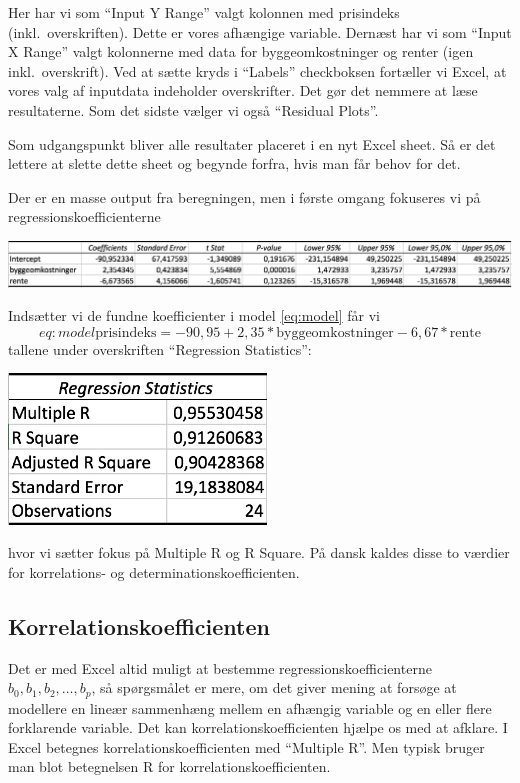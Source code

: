 Her har vi som ``Input Y Range'' valgt kolonnen med prisindeks (inkl.\ overskriften). Dette er vores afhængige variable. Dernæst har vi som ``Input X Range'' valgt kolonnerne med data for byggeomkostninger og renter (igen inkl.\ overskrift). Ved at sætte kryds i ``Labels'' checkboksen fortæller vi Excel, at vores valg af inputdata indeholder overskrifter. Det gør det nemmere at læse resultaterne. Som det sidste vælger vi også ``Residual Plots''.

Som udgangspunkt bliver alle resultater placeret i en nyt Excel sheet. Så er det lettere at slette dette sheet og begynde forfra, hvis man får behov for det.

Der er en masse output fra beregningen, men i første omgang fokuseres vi på regressionskoefficienterne
\begin{center}\label{figure:regressionCoefficients}
\includegraphics[width=16cm]{regression/images/regressionCoefficients.JPG}
\end{center}
Indsætter vi de fundne koefficienter i model \ref{eq:model} får vi
\begin{displaymath}{eq:model}
  \textrm{prisindeks} = -90,95 + 2,35 * \textrm{byggeomkostninger} - 6,67 * \textrm{rente}
\end{displaymath}
tallene under overskriften ``Regression Statistics'':
\begin{center}\label{tabel:resultat}
\includegraphics[height=4cm]{regression/images/resultat.JPG}
\end{center}
hvor vi sætter fokus på Multiple R og R Square. På dansk kaldes disse to værdier for korrelations- og determinationskoefficienten.

\subsection{Korrelationskoefficienten}
Det er med Excel altid muligt at bestemme regressionskoefficienterne \(b_0,b_1,b_2,\ldots,b_p\), så spørgsmålet er mere, om det giver mening at forsøge at modellere en lineær sammenhæng mellem en afhængig variable og en eller flere forklarende variable. Det kan korrelationskoefficienten hjælpe os med at afklare. I Excel betegnes korrelationskoefficienten med ``Multiple R''. Men typisk bruger man blot betegnelsen R for korrelationskoefficienten.


